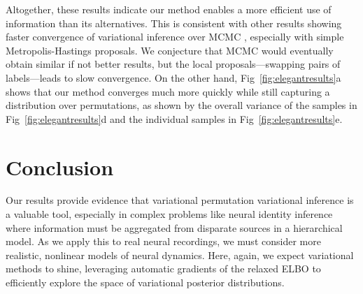 \documentclass[twoside]{article}
\begin{document}
Altogether, these results indicate our method enables a more efficient
use of information than its alternatives. This is consistent with
other results showing faster convergence of variational inference over
MCMC \citep{Blei2017}, especially with simple Metropolis-Hastings
proposals. We conjecture that MCMC would eventually obtain similar if
not better results, but the local proposals---swapping pairs of
labels---leads to slow convergence. On the other hand,
Fig~\ref{fig:elegantresults}a shows that our method converges much
more quickly while still capturing a distribution over permutations,
as shown by the overall variance of the samples in Fig~\ref{fig:elegantresults}d and the individual samples in Fig~\ref{fig:elegantresults}e.

\section{Conclusion}

Our results provide evidence that variational permutation
variational inference is a valuable tool, especially in complex
problems like neural identity inference where information must be
aggregated from disparate sources in a hierarchical model.  As we
apply this to real neural recordings, we must consider more realistic,
nonlinear models of neural dynamics. Here, again, we expect
variational methods to shine, leveraging automatic gradients of the
relaxed ELBO to efficiently explore the space of variational posterior
distributions.





\pagebreak 
\appendix




\end{document}
